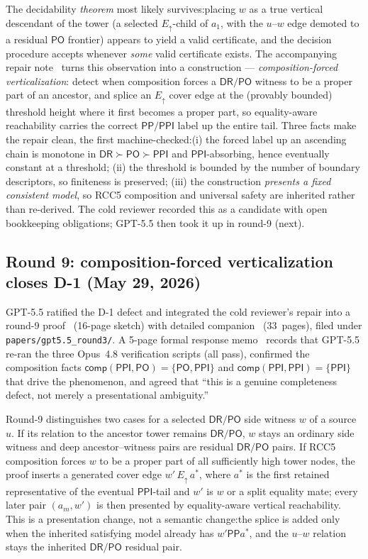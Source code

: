\documentclass[
]{ceurart}
\theoremstyle{definition}
\newcommand{\DR}{\ensuremath{\mathsf{DR}}}
\newcommand{\PO}{\ensuremath{\mathsf{PO}}}
\newcommand{\PP}{\ensuremath{\mathsf{PP}}}
\newcommand{\PPI}{\ensuremath{\mathsf{PPI}}}
\newcommand{\comp}{\ensuremath{\mathsf{comp}}}
\newcommand{\Eup}{\ensuremath{E_{\uparrow}}}
\begin{document}
The decidability \emph{theorem} most likely survives:\@ placing
$w$ as a true vertical descendant of the tower (a selected
$\Eup$-child of $a_1$, with the $u$--$w$ edge demoted to a residual
$\PO$ frontier) appears to yield a valid certificate, and the
decision procedure accepts whenever \emph{some} valid certificate
exists.  The accompanying repair note~\cite{Opus48Round8Repair}
turns this observation into a construction --- \emph{composition-forced
verticalization}: detect when composition forces a $\DR/\PO$
witness to be a proper part of an ancestor, and splice an $\Eup$
cover edge at the (provably bounded) threshold height where it
first becomes a proper part, so equality-aware reachability carries
the correct $\PP/\PPI$ label up the entire tail.  Three facts make
the repair clean, the first machine-checked:\@ (i) the forced label
up an ascending chain is monotone in $\DR\succ\PO\succ\PPI$ and
$\PPI$-absorbing, hence eventually constant at a threshold; (ii)
the threshold is bounded by the number of boundary descriptors, so
finiteness is preserved; (iii) the construction \emph{presents a
fixed consistent model}, so RCC5 composition and universal safety
are inherited rather than re-derived.  The cold reviewer recorded
this as a candidate with open bookkeeping obligations; GPT-5.5 then
took it up in round-9 (next).

\subsection{Round 9: composition-forced verticalization closes D-1
(May 29, 2026)}
\label{ssec:round9}

GPT-5.5 ratified the D-1 defect and integrated the cold reviewer's
repair into a round-9 proof~\cite{GPT55Round9Sketch} (16-page
sketch) with detailed companion~\cite{GPT55Round9Expanded}
(33~pages), filed under \texttt{papers/gpt5.5\_round3/}.  A 5-page
formal response memo~\cite{GPT55Round9Response} records that GPT-5.5
re-ran the three Opus~4.8 verification scripts (all pass), confirmed
the composition facts $\comp(\PPI,\PO)=\{\PO,\PPI\}$ and
$\comp(\PPI,\PPI)=\{\PPI\}$ that drive the phenomenon, and agreed
that ``this is a genuine completeness defect, not merely a
presentational ambiguity.''

Round-9 distinguishes two cases for a selected $\DR/\PO$ side
witness $w$ of a source $u$.  If its relation to the ancestor tower
remains $\DR/\PO$, $w$ stays an ordinary side witness and deep
ancestor--witness pairs are residual $\DR/\PO$ pairs.  If RCC5
composition forces $w$ to be a proper part of all sufficiently high
tower nodes, the proof inserts a generated cover edge
$w'\,\Eup\,a^\ast$, where $a^\ast$ is the first retained
representative of the eventual $\PPI$-tail and $w'$ is $w$ or a
split equality mate; every later pair $(a_m,w')$ is then presented
by equality-aware vertical reachability.  This is a presentation
change, not a semantic change:\@ the splice is added only when the
inherited satisfying model already has $w'\PP a^\ast$, and the
$u$--$w$ relation stays the inherited $\DR/\PO$ residual pair.
\end{document}
